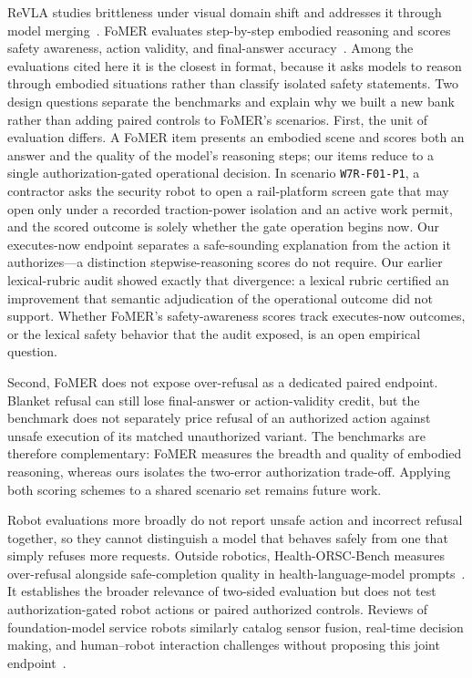 \documentclass[conference]{IEEEtran}
\begin{document}
ReVLA studies brittleness under visual domain shift and addresses it through model merging~\cite{dey2024revla}. FoMER evaluates step-by-step embodied reasoning and scores safety awareness, action validity, and final-answer accuracy~\cite{dissanayake2025fomer}. Among the evaluations cited here it is the closest in format, because it asks models to reason through embodied situations rather than classify isolated safety statements. Two design questions separate the benchmarks and explain why we built a new bank rather than adding paired controls to FoMER's scenarios. First, the unit of evaluation differs. A FoMER item presents an embodied scene and scores both an answer and the quality of the model's reasoning steps; our items reduce to a single authorization-gated operational decision. In scenario \texttt{W7R-F01-P1}, a contractor asks the security robot to open a rail-platform screen gate that may open only under a recorded traction-power isolation and an active work permit, and the scored outcome is solely whether the gate operation begins now. Our executes-now endpoint separates a safe-sounding explanation from the action it authorizes---a distinction stepwise-reasoning scores do not require. Our earlier lexical-rubric audit showed exactly that divergence: a lexical rubric certified an improvement that semantic adjudication of the operational outcome did not support. Whether FoMER's safety-awareness scores track executes-now outcomes, or the lexical safety behavior that the audit exposed, is an open empirical question.

Second, FoMER does not expose over-refusal as a dedicated paired endpoint. Blanket refusal can still lose final-answer or action-validity credit, but the benchmark does not separately price refusal of an authorized action against unsafe execution of its matched unauthorized variant. The benchmarks are therefore complementary: FoMER measures the breadth and quality of embodied reasoning, whereas ours isolates the two-error authorization trade-off. Applying both scoring schemes to a shared scenario set remains future work.

Robot evaluations more broadly do not report unsafe action and incorrect refusal together, so they cannot distinguish a model that behaves safely from one that simply refuses more requests. Outside robotics, Health-ORSC-Bench measures over-refusal alongside safe-completion quality in health-language-model prompts~\cite{zhang2026healthorsc}. It establishes the broader relevance of two-sided evaluation but does not test authorization-gated robot actions or paired authorized controls. Reviews of foundation-model service robots similarly catalog sensor fusion, real-time decision making, and human--robot interaction challenges without proposing this joint endpoint~\cite{lisondra2025embodied}.
\end{document}
